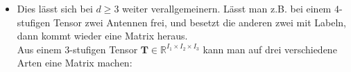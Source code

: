 \documentclass[11pt]{article} %
\theoremstyle{definition}
\numberwithin{equation}{section}
\begin{document}
\begin{itemize}
\item

\begin{changemargin}{0pt}{0pt}
Dies lässt sich bei $d\geq3$ weiter verallgemeinern. Lässt man z.B. bei einem $4$-stufigen Tensor zwei Antennen frei,
und besetzt die anderen zwei mit Labeln, dann kommt wieder eine Matrix heraus.\\
Aus einem $3$-stufigen Tensor $\mathbf{T} \in \mathbb{R}^{I_{1}\times I_{2} \times I_{3}}$ kann man auf drei verschiedene Arten eine Matrix machen:
\end{changemargin}
\begin{changemargin}{20pt}{20pt}

\begin{center}
\begin{minipage}{.2\textwidth}
%
%
\end{minipage}
\end{center}

\end{changemargin}


%
\begin{changemargin}{20pt}{20pt}


\end{changemargin}
\end{itemize}
\end{document}
